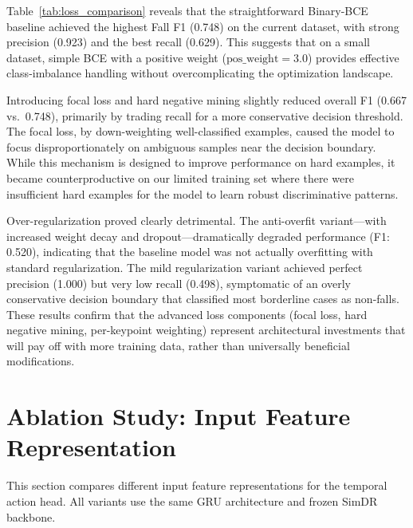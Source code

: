Table~\ref{tab:loss_comparison} reveals that the straightforward Binary-BCE baseline achieved the highest Fall F1 (0.748) on the current dataset, with strong precision (0.923) and the best recall (0.629). This suggests that on a small dataset, simple BCE with a positive weight ($\text{pos\_weight} = 3.0$) provides effective class-imbalance handling without overcomplicating the optimization landscape.

Introducing focal loss and hard negative mining slightly reduced overall F1 (0.667 vs.\ 0.748), primarily by trading recall for a more conservative decision threshold. The focal loss, by down-weighting well-classified examples, caused the model to focus disproportionately on ambiguous samples near the decision boundary. While this mechanism is designed to improve performance on hard examples, it became counterproductive on our limited training set where there were insufficient hard examples for the model to learn robust discriminative patterns.

Over-regularization proved clearly detrimental. The anti-overfit variant---with increased weight decay and dropout---dramatically degraded performance (F1: 0.520), indicating that the baseline model was not actually overfitting with standard regularization. The mild regularization variant achieved perfect precision (1.000) but very low recall (0.498), symptomatic of an overly conservative decision boundary that classified most borderline cases as non-falls. These results confirm that the advanced loss components (focal loss, hard negative mining, per-keypoint weighting) represent architectural investments that will pay off with more training data, rather than universally beneficial modifications.

\section{Ablation Study: Input Feature Representation}
\label{sec:ablation_feature}

This section compares different input feature representations for the temporal action head. All variants use the same GRU architecture and frozen SimDR backbone.

\begin{table}[t]
\centering
\caption{Feature representation comparison (all using GRU architecture, frozen SimDR backbone).}
\label{tab:feature_comparison}
\end{table}

